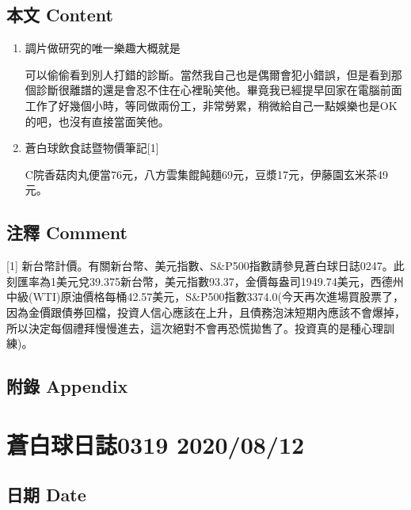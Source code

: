 \documentclass[a5paper, 11pt
]{book}
\begin{document}
\hypertarget{ux672cux6587-content-71}{%
\subsection{本文 Content}\label{ux672cux6587-content-71}}

\begin{enumerate}
\def\labelenumi{\arabic{enumi}.}
\item
  調片做研究的唯一樂趣大概就是

  可以偷偷看到別人打錯的診斷。當然我自己也是偶爾會犯小錯誤，但是看到那個診斷很離譜的還是會忍不住在心裡恥笑他。畢竟我已經提早回家在電腦前面工作了好幾個小時，等同做兩份工，非常勞累，稍微給自己一點娛樂也是OK的吧，也沒有直接當面笑他。
\item
  蒼白球飲食誌暨物價筆記{[}1{]}

  C院香菇肉丸便當76元，八方雲集餛飩麵69元，豆漿17元，伊藤園玄米茶49元。
\end{enumerate}

\hypertarget{ux6ce8ux91cb-comment-71}{%
\subsection{注釋 Comment}\label{ux6ce8ux91cb-comment-71}}

{[}1{]}
新台幣計價。有關新台幣、美元指數、S\&P500指數請參見蒼白球日誌0247。此刻匯率為1美元兌39.375新台幣，美元指數93.37，金價每盎司1949.74美元，西德州中級(WTI)原油價格每桶42.57美元，S\&P500指數3374.0(今天再次進場買股票了，因為金價跟債券回檔，投資人信心應該在上升，且債務泡沫短期內應該不會爆掉，所以決定每個禮拜慢慢進去，這次絕對不會再恐慌拋售了。投資真的是種心理訓練)。

\hypertarget{ux9644ux9304-appendix-71}{%
\subsection{附錄 Appendix}\label{ux9644ux9304-appendix-71}}

\hypertarget{ux84bcux767dux7403ux65e5ux8a8c0319-20200812}{%
\section{蒼白球日誌0319
2020/08/12}\label{ux84bcux767dux7403ux65e5ux8a8c0319-20200812}}

\hypertarget{ux65e5ux671f-date-72}{%
\subsection{日期 Date}\label{ux65e5ux671f-date-72}}
\end{document}
